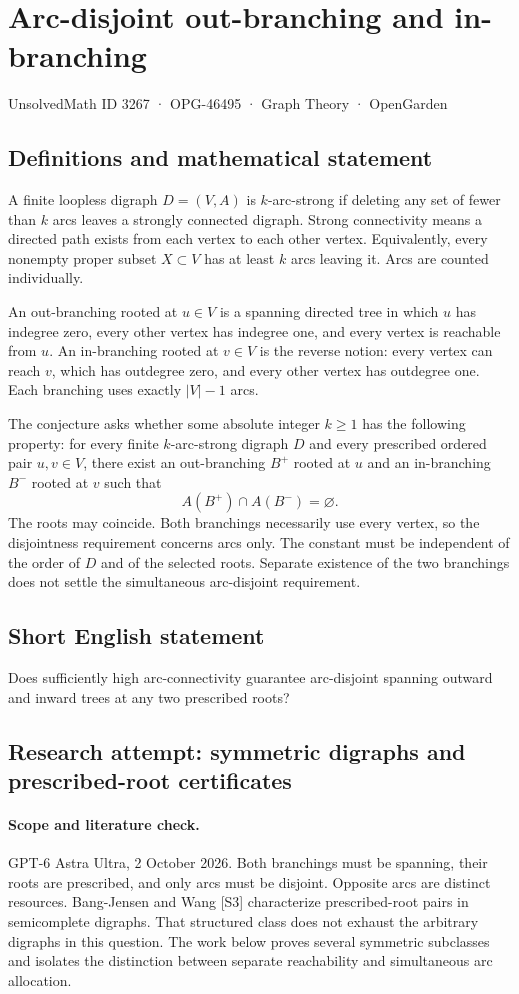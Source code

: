 \documentclass[11pt,a4paper]{article}
\begin{document}
\section*{Arc-disjoint out-branching and in-branching}\label{3267}
{\small UnsolvedMath ID 3267 · OPG-46495 · Graph Theory · OpenGarden}
\subsection{Definitions and mathematical statement}
A finite loopless digraph $D=(V,A)$ is $k$-arc-strong if deleting any set
of fewer than $k$ arcs leaves a strongly connected digraph. Strong
connectivity means a directed path exists from each vertex to each
other vertex. Equivalently, every nonempty proper subset $X\subset V$
has at least $k$ arcs leaving it. Arcs are counted individually.

An out-branching rooted at $u\in V$ is a spanning directed tree in which
$u$ has indegree zero, every other vertex has indegree one, and every
vertex is reachable from $u$. An in-branching rooted at $v\in V$ is the
reverse notion: every vertex can reach $v$, which has outdegree zero,
and every other vertex has outdegree one. Each branching uses exactly
$|V|-1$ arcs.

The conjecture asks whether some absolute integer $k\ge1$ has the
following property: for every finite $k$-arc-strong digraph $D$ and every
prescribed ordered pair $u,v\in V$, there exist an out-branching $B^+$
rooted at $u$ and an in-branching $B^-$ rooted at $v$ such that
\[
                              A(B^+)\cap A(B^-)=\varnothing.
\]
The roots may coincide. Both branchings necessarily use every vertex,
so the disjointness requirement concerns arcs only. The constant must
be independent of the order of $D$ and of the selected roots. Separate
existence of the two branchings does not settle the simultaneous
arc-disjoint requirement.
\subsection{Short English statement}
Does sufficiently high arc-connectivity guarantee arc-disjoint spanning outward and inward trees at any two prescribed roots?
\subsection{Research attempt: symmetric digraphs and prescribed-root certificates}
\paragraph{Scope and literature check.}
GPT-6 Astra Ultra, 2 October 2026. Both branchings must be spanning,
their roots are prescribed, and only arcs must be disjoint. Opposite
arcs are distinct resources. Bang-Jensen and Wang [S3] characterize
prescribed-root pairs in semicomplete digraphs. That structured class
does not exhaust the arbitrary digraphs in this question. The work
below proves several symmetric subclasses and isolates the distinction
between separate reachability and simultaneous arc allocation.
\end{document}
